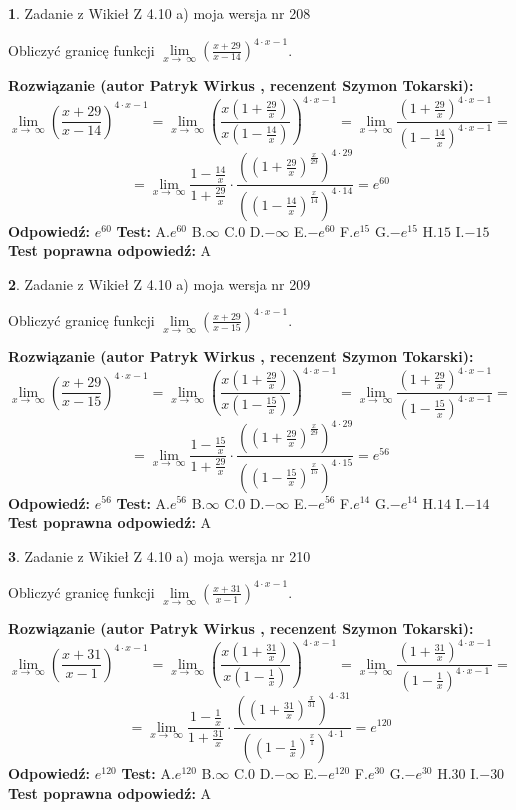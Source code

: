 \documentclass[12pt, a4paper]{article}
\theoremstyle{definition} %
\newtheorem{zad}{}
\newcommand{\zadStart}[1]{\begin{zad}#1\newline}
\newcommand{\zadStop}{\end{zad}}
\newcommand{\rozwStart}[2]{\noindent \textbf{Rozwiązanie (autor #1 , recenzent #2): }\newline}
\newcommand{\rozwStop}{\newline}
\newcommand{\odpStart}{\noindent \textbf{Odpowiedź:}\newline}
\newcommand{\odpStop}{\newline}
\newcommand{\testStart}{\noindent \textbf{Test:}\newline}
\newcommand{\testStop}{\newline}
\newcommand{\kluczStart}{\noindent \textbf{Test poprawna odpowiedź:}\newline}
\newcommand{\kluczStop}{\newline}
\begin{document}
\zadStart{Zadanie z Wikieł Z 4.10 a) moja wersja nr 208}

Obliczyć granicę funkcji  $\lim\limits_{x\to\ \infty}(\frac{x+29}{x-14})^{4\cdot x-1}$.
\zadStop
\rozwStart{Patryk Wirkus}{Szymon Tokarski}
$$\lim\limits_{x\to\ \infty}(\frac{x+29}{x-14})^{4\cdot x-1} = \lim\limits_{x\to\ \infty}(\frac{x(1+\frac{29}{x})}{x(1-\frac{14}{x})})^{4\cdot x-1}=\lim\limits_{x\to\ \infty}\frac{(1+\frac{29}{x})^{4\cdot x-1}}{(1-\frac{14}{x})^{4\cdot x-1}}=$$
$$=\lim\limits_{x\to\ \infty}\frac{1-\frac{14}{x}}{1+\frac{29}{x}}\cdot\frac{((1+\frac{29}{x})^{\frac{x}{29}})^{4\cdot29}}{((1-\frac{14}{x})^{\frac{x}{14}})^{4\cdot14}}=e^{60}$$
\rozwStop
\odpStart
$e^{60}$
\odpStop
\testStart
A.$e^{60}$ B.$\infty$ C.$0$ D.$-\infty$ E.$-e^{60}$
F.$e^{15}$ G.$-e^{15}$
H.$15$
I.$-15$
\testStop
\kluczStart
A
\kluczStop



\zadStart{Zadanie z Wikieł Z 4.10 a) moja wersja nr 209}

Obliczyć granicę funkcji  $\lim\limits_{x\to\ \infty}(\frac{x+29}{x-15})^{4\cdot x-1}$.
\zadStop
\rozwStart{Patryk Wirkus}{Szymon Tokarski}
$$\lim\limits_{x\to\ \infty}(\frac{x+29}{x-15})^{4\cdot x-1} = \lim\limits_{x\to\ \infty}(\frac{x(1+\frac{29}{x})}{x(1-\frac{15}{x})})^{4\cdot x-1}=\lim\limits_{x\to\ \infty}\frac{(1+\frac{29}{x})^{4\cdot x-1}}{(1-\frac{15}{x})^{4\cdot x-1}}=$$
$$=\lim\limits_{x\to\ \infty}\frac{1-\frac{15}{x}}{1+\frac{29}{x}}\cdot\frac{((1+\frac{29}{x})^{\frac{x}{29}})^{4\cdot29}}{((1-\frac{15}{x})^{\frac{x}{15}})^{4\cdot15}}=e^{56}$$
\rozwStop
\odpStart
$e^{56}$
\odpStop
\testStart
A.$e^{56}$ B.$\infty$ C.$0$ D.$-\infty$ E.$-e^{56}$
F.$e^{14}$ G.$-e^{14}$
H.$14$
I.$-14$
\testStop
\kluczStart
A
\kluczStop



\zadStart{Zadanie z Wikieł Z 4.10 a) moja wersja nr 210}

Obliczyć granicę funkcji  $\lim\limits_{x\to\ \infty}(\frac{x+31}{x-1})^{4\cdot x-1}$.
\zadStop
\rozwStart{Patryk Wirkus}{Szymon Tokarski}
$$\lim\limits_{x\to\ \infty}(\frac{x+31}{x-1})^{4\cdot x-1} = \lim\limits_{x\to\ \infty}(\frac{x(1+\frac{31}{x})}{x(1-\frac{1}{x})})^{4\cdot x-1}=\lim\limits_{x\to\ \infty}\frac{(1+\frac{31}{x})^{4\cdot x-1}}{(1-\frac{1}{x})^{4\cdot x-1}}=$$
$$=\lim\limits_{x\to\ \infty}\frac{1-\frac{1}{x}}{1+\frac{31}{x}}\cdot\frac{((1+\frac{31}{x})^{\frac{x}{31}})^{4\cdot31}}{((1-\frac{1}{x})^{\frac{x}{1}})^{4\cdot1}}=e^{120}$$
\rozwStop
\odpStart
$e^{120}$
\odpStop
\testStart
A.$e^{120}$ B.$\infty$ C.$0$ D.$-\infty$ E.$-e^{120}$
F.$e^{30}$ G.$-e^{30}$
H.$30$
I.$-30$
\testStop
\kluczStart
A
\kluczStop
\end{document}
